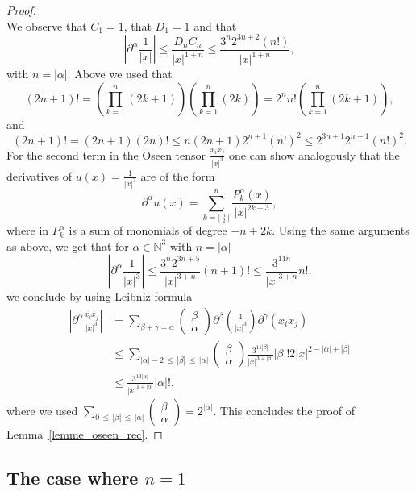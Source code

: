 \documentclass[10pt]{amsart}
\theoremstyle{definition}\newtheorem{defi}[theo]{Definition}\newtheorem{rema}[theo]{Remark}\newtheorem{exam}[theo]{Example}\newtheorem{exem}[theo]{Example}\newtheorem{nota}[theo]{Notation}
\newcommand{\N}{\mathbb{N}}
\renewcommand{\leq}{\leqslant}
\begin{document}
\begin{proof}
\[\]
We observe that $C_1=1$, that $D_1=1$ and that
\[
|\partial^\alpha \frac{1}{|x|} |\leq \frac{D_n C_n}{|x|^{1+n}} \leq \frac{3^{n} 2^{3n+2}(n!)} {|x|^{1+n}},
\]
with $n=|\alpha|$. Above we used that
\[
(2n+1)!=\left(\underset{k=1}{\overset{n}{\prod}} (2k+1)\right)\left(\underset{k=1}{\overset{n}{\prod}} (2k)\right)=2^n n! \left(\underset{k=1}{\overset{n}{\prod}} (2k+1)\right),
\]
and
\[
(2n+1)! = (2n+1) (2n)! \leq n(2n+1) 2^{n+1} (n!)^2 \leq 2^{3n+1} 2^{n+1} (n!)^2.
\]
For the second term in the Oseen tensor $\frac{x_ix_j}{|x|^3} $ one can show analogously that the derivatives of $u(x)=\frac{1}{|x|^3} $ are of the form
\[
\partial^\alpha u(x)= \underset{k=\lceil \frac{n}{2}\rceil}{\overset{n}{\sum}}\frac{P_k^\alpha(x)}{|x|^{2k+3}},
\]
where in $P_k^\alpha$ is a sum of monomials of degree $ -n+2k $. Using the same arguments as above, we get that for $\alpha \in \N^3$ with $n=|\alpha|$
\[
\left|\partial^\alpha \frac{1}{|x|^3}\right|\leq \frac{3^{n} 2^{3n+5} }{|x|^{3+n}} (n+1)! \leq \frac{3^{11n}}{|x|^{3+n}} n!.
\]
we conclude by using Leibniz formula
\begin{align*}
\left|\partial^\alpha \frac{x_i x_j}{|x|^3} \right|&= \underset{\beta+\gamma=\alpha}{\sum}
\begin{pmatrix} \beta \\ \alpha
\end{pmatrix} \partial^\beta \left(\frac{1}{|x|^3}\right) \partial^{\gamma} (x_ix_j) \\
&\leq \underset{|\alpha|-2\,\leq\,|\beta|\,\leq\,
|\alpha|}{\sum}
\begin{pmatrix} \beta \\ \alpha
\end{pmatrix} \frac{3^{11|\beta|}}{|x|^{3+|\beta|}}|\beta|! 2|x|^{2-|\alpha|+|\beta|}\\
&\leq \frac{3^{13|\alpha|}}{|x|^{1+|\alpha|}}|\alpha|!.
\end{align*}
where we used $ {\sum}_{0\,\leq\,|\beta|\,\leq\,
|\alpha|}
(\begin{smallmatrix}
\beta \\ \alpha
\end{smallmatrix})=2^{|\alpha|} $.
This concludes the proof of Lemma~\ref{lemme_oseen_rec}.
\end{proof}



\subsection{The case where \texorpdfstring{$n=1$}{n=1}}
\end{document}
